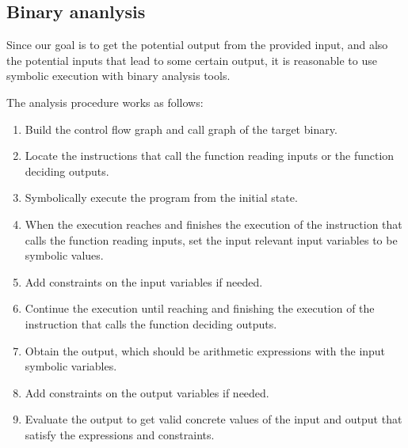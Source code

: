 \subsection{Binary ananlysis}


Since our goal is to get the potential output from the provided input, and also
the potential inputs that lead to some certain output, it is reasonable to use
symbolic execution with binary analysis tools.

The analysis procedure works as follows:
\begin{enumerate}
    \item Build the control flow graph and call graph of the target binary.
    \item Locate the instructions that call the function reading inputs or the
        function deciding outputs.
    \item Symbolically execute the program from the initial state.
    \item When the execution reaches and finishes the execution of the
        instruction that calls the function reading inputs, set the input
        relevant input variables to be symbolic values.
    \item Add constraints on the input variables if needed.
    \item Continue the execution until reaching and finishing the execution of
        the instruction that calls the function deciding outputs.
    \item Obtain the output, which should be arithmetic expressions with the
        input symbolic variables.
    \item Add constraints on the output variables if needed.
    \item Evaluate the output to get valid concrete values of the input and
        output that satisfy the expressions and constraints.
\end{enumerate}



